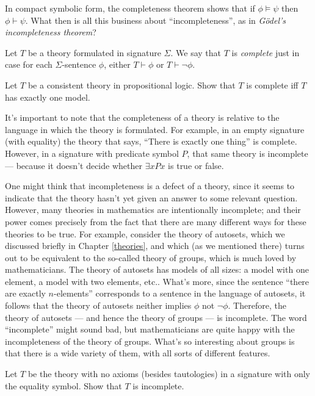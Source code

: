 In compact symbolic form, the completeness theorem shows that if
$\phi\vDash\psi$ then $\phi\vdash\psi$.  What then is all this
business about ``incompleteness'', as in \emph{G{\"o}del's
  incompleteness theorem}?

\begin{defn} Let $T$ be a theory formulated in signature $\Sigma$.  We
  say that $T$ is \emph{\gls{complete}} just in case for each
  $\Sigma$-sentence $\phi$, either $T\vdash\phi$ or
  $T\vdash\neg\phi$. \end{defn}

\begin{exercise} Let $T$ be a consistent theory in propositional
  logic.  Show that $T$ is complete iff $T$ has exactly one
  model. \end{exercise}

It's important to note that the completeness of a theory is relative
to the language in which the theory is formulated.  For example, in an
empty signature (with equality) the theory that says, ``There is
exactly one thing'' is complete.  However, in a signature with
predicate symbol $P$, that same theory is incomplete --- because it
doesn't decide whether $\exists xPx$ is true or false.

One might think that incompleteness is a defect of a theory, since it
seems to indicate that the theory hasn't yet given an answer to some
relevant question.  However, many theories in mathematics are
intentionally incomplete; and their power comes precisely from the
fact that there are many different ways for these theories to be true.
For example, consider the theory of autosets, which we discussed
briefly in Chapter \ref{theories}, and which (as we mentioned there)
turns out to be equivalent to the so-called theory of groups, which is
much loved by mathematicians.  The theory of autosets has models of
all sizes: a model with one element, a model with two elements, etc..
What's more, since the sentence ``there are exactly $n$-elements''
corresponds to a sentence in the language of autosets, it follows that
the theory of autosets neither implies $\phi$ not $\neg \phi$.
Therefore, the theory of autosets --- and hence the theory of groups
--- is incomplete.  The word ``incomplete'' might sound bad, but
mathematicians are quite happy with the incompleteness of the theory
of groups.  What's so interesting about groups is that there is a wide
variety of them, with all sorts of different features.

\begin{exercise} Let $T$ be the theory with no axioms (besides
  tautologies) in a signature with only the equality symbol.  Show
  that $T$ is incomplete. \end{exercise}

